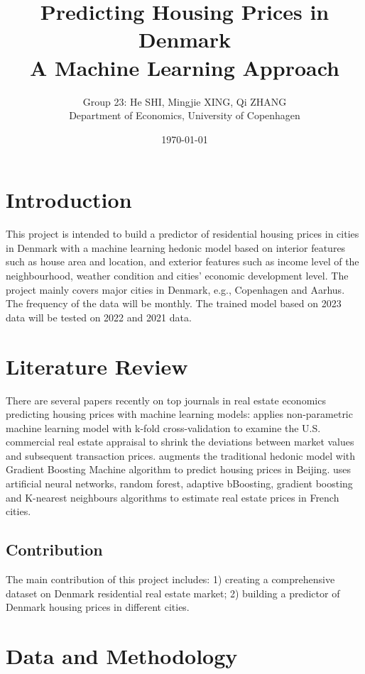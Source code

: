 \documentclass[12pt]{article} %
\title{Predicting Housing Prices in Denmark\\ A Machine Learning Approach}
\author{Group 23: He SHI, Mingjie XING, Qi ZHANG\\Department of Economics, University of Copenhagen}
\date{\today} %
\begin{document}
\maketitle



\section{Introduction}
  		This project is intended to build a predictor of residential housing prices in cities in Denmark with a machine learning hedonic model based on interior features such as house area and location, and exterior features such as income level of the neighbourhood, weather condition and cities' economic development level. The project mainly covers major cities in Denmark, e.g., Copenhagen and Aarhus. The frequency of the data will be monthly. The trained model based on 2023 data will be tested on 2022 and 2021 data. 

\section{Literature Review}
		There are several papers recently on top journals in real estate economics predicting housing prices with machine learning models: \newline
		\cite{Deppneretal2023} applies non-parametric machine learning model with k-fold cross-validation to examine the U.S. commercial real estate appraisal to shrink the deviations between market values and subsequent transaction prices. \newline
		\cite{Linetal2023} augments the traditional hedonic model with Gradient Boosting Machine algorithm to predict housing prices in Beijing. \newline
		\cite{TchuenteNyawa2022} uses artificial neural networks, random forest, adaptive bBoosting, gradient boosting and K-nearest neighbours algorithms to estimate real estate prices in French cities.
	\subsection{Contribution}
		The main contribution of this project includes: 1) creating a comprehensive dataset on Denmark residential real estate market; 2) building a predictor of Denmark housing prices in different cities.

		

\section{Data and Methodology}
\end{document}
